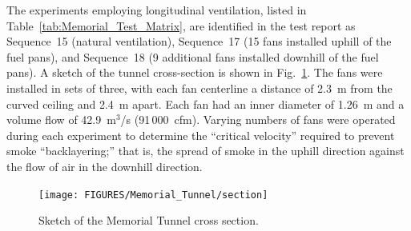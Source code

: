 The experiments employing longitudinal ventilation, listed in Table~\ref{tab:Memorial_Test_Matrix}, are identified in the test report as Sequence~15 (natural ventilation), Sequence~17 (15 fans installed uphill of the fuel pans), and Sequence~18 (9 additional fans installed downhill of the fuel pans). A sketch of the tunnel cross-section is shown in Fig.~\ref{Memorial_Tunnel_Cross_Section}.  The fans were installed in sets of three, with each fan centerline a distance of 2.3~m from the curved ceiling and 2.4~m apart. Each fan had an inner diameter of 1.26~m and a volume flow of 42.9~m$^3$/s (91\,000~cfm). Varying numbers of fans were operated during each experiment to determine the ``critical velocity'' required to prevent smoke ``backlayering;'' that is, the spread of smoke in the uphill direction against the flow of air in the downhill direction.

\begin{figure}[!ht]
\centering
\texttt{[image: FIGURES/Memorial\_Tunnel/section]}
\caption[Memorial Tunnel cross section]{Sketch of the Memorial Tunnel cross section.}
\label{Memorial_Tunnel_Cross_Section}
\end{figure}


